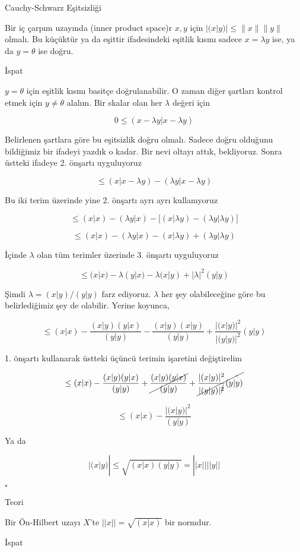 \documentclass[12pt,fleqn]{article}\usepackage{../../common}
\begin{document}
Cauchy-Schwarz Eşitsizliği

Bir iç çarpım uzayında (inner product space)r $x,y$ için $|(x|y)| \le
\|x\|\|y\|$ olmalı. Bu küçüktür ya da eşittir ifadesindeki eşitlik kısmı sadece $x = \lambda y$
ise, ya da $y = \theta$ ise doğru. 

İspat

$y = \theta$ için eşitlik kısmı basitçe doğrulanabilir. O zaman diğer
şartları kontrol etmek için $y \ne \theta$ alalım. Bir skalar olan her
$\lambda$ değeri için 

$$ 
0 \le (x-\lambda y | x-\lambda y) 
 $$

Belirlenen şartlara göre bu eşitsizlik doğru olmalı. Sadece doğru olduğunu
bildiğimiz bir ifadeyi yazdık o kadar. Bir nevi oltayı attık, bekliyoruz. 
Sonra üstteki ifadeye 2. önşartı uyguluyoruz

$$ \le (x|x-\lambda y) - (\lambda y| x - \lambda y)$$

Bu iki terim üzerinde yine 2. önşartı ayrı ayrı kullanıyoruz

$$ 
\le (x|x) - (\lambda y|x) - 
\bigg[ (x|\lambda y) - (\lambda y|\lambda y) \bigg] 
$$

$$ 
\le (x|x) - (\lambda y|x) -  (x|\lambda y) + (\lambda y|\lambda y) 
$$

İçinde $\lambda$ olan tüm terimler üzerinde 3. önşartı uyguluyoruz

$$ 
\le
(x|x) - \lambda(y|x) -
\lambda(x|y) + |\lambda|^2 (y|y)
 $$

Şimdi $\lambda  = (x|y)/(y|y)$ farz ediyoruz. $\lambda$ her şey olabileceğine göre bu 
belirlediğimiz şey de olabilir. Yerine koyunca, 

$$ \le (x|x) - 
\frac{ (x|y)(y|x)}{(y|y)} - 
\frac{ (x|y)(x|y)}{(y|y)} + 
\frac{ |(x|y)|^2}{|(y|y)|^2}(y|y)
 $$

1. önşartı kullanarak üstteki üçüncü terimin işaretini değiştirelim

$$ \le (x|x) - 
\frac{ (x|y)(y|x)}{(y|y)} +
\cancel{\frac{ (x|y)(y|x)}{(y|y)}} + 
\cancel{\frac{ |(x|y)|^2}{|(y|y)|^{\cancel{2}}}(y|y)}
 $$

$$ \le (x|x) - 
\frac{ |(x|y)|^2}{(y|y)}
 $$

Ya da 

$$ |(x|y)|  \le \sqrt{ (x|x)(y|y)} = ||x||||y||$$

$\square$

Teori 

Bir Ön-Hilbert uzayı $X$'te $||x|| = \sqrt{ (x|x)}$ bir normdur. 

İspat
\end{document}
